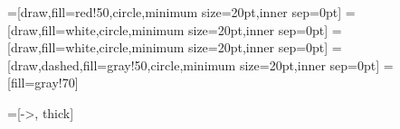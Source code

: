     \newcommand{\width}{0.2}
    


=[draw,fill=red!50,circle,minimum size=20pt,inner sep=0pt]
=[draw,fill=white,circle,minimum size=20pt,inner sep=0pt]
=[draw,fill=white,circle,minimum size=20pt,inner sep=0pt]
=[draw,dashed,fill=gray!50,circle,minimum size=20pt,inner sep=0pt]
=[fill=gray!70]

=[->, thick]

